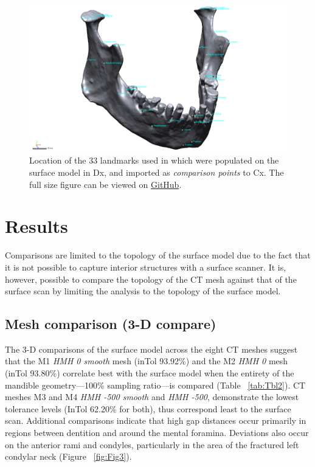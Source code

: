 \documentclass[review]{elsarticle}
\begin{document}
\begin{figure}[ht]\centering
\includegraphics[width=\linewidth]{Fig4}
\caption{Location of the 33 landmarks used in \citet[Supplementary Information]{RN11477} which were populated on the surface model in Dx, and imported as \textit{comparison points} to Cx. The full size figure can be viewed on \href{https://github.com/aksel-blaise/cai.mandible/blob/main/figures/Fig4.png}{GitHub}.}
\label{fig:Fig4}
\end{figure}

\section{Results}

Comparisons are limited to the topology of the surface model due to the fact that it is not possible to capture interior structures with a surface scanner. It is, however, possible to compare the topology of the CT mesh against that of the surface scan by limiting the analysis to the topology of the surface model. 

\subsection{Mesh comparison (3-D compare)}

The 3-D comparisons of the surface model across the eight CT meshes suggest that the M1 \textit{HMH 0 smooth} mesh (inTol 93.92\%) and the M2 \textit{HMH 0} mesh (inTol 93.80\%) correlate best with the surface model when the entirety of the mandible geometry---100\% sampling ratio---is compared (Table ~\ref{tab:Tbl2}). CT meshes M3 and M4 \textit{HMH -500 smooth} and \textit{HMH -500}, demonstrate the lowest tolerance levels (InTol 62.20\% for both), thus correspond least to the surface scan. Additional comparisons indicate that high gap distances occur primarily in regions between dentition and around the mental foramina. Deviations also occur on the anterior rami and condyles, particularly in the area of the fractured left condylar neck (Figure ~\ref{fig:Fig3}). 
\end{document}

